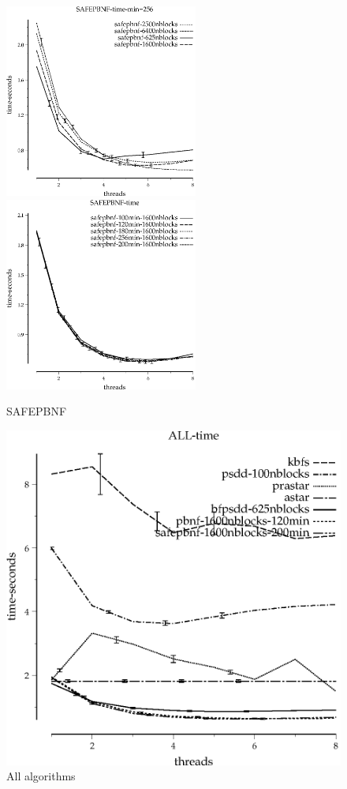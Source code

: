 \documentclass{article}
\begin{document}
\begin{figure}
\begin{center}
\includegraphics[width=2.5in]{SAFEPBNF-time-min=256}
\includegraphics[width=2.5in]{SAFEPBNF-time}
\end{center}
\caption{SAFEPBNF}
\end{figure}

\begin{figure}
\begin{center}
\includegraphics{ALL-time}
\end{center}
\caption{All algorithms}
\end{figure}
\end{document}
